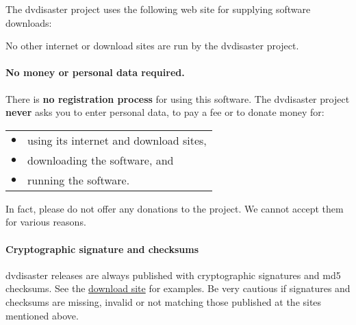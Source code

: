 \smallskip

The dvdisaster project uses the following web site for supplying software downloads:

\begin{center}
  \homepage
\end{center}

\begin{comment}
The dvdisaster project uses the following internet domains for publishing
its web sites and supplying software downloads:

\begin{center}
  \begin{tabular}{l}
dvdisaster.com\\
dvdisaster.de\\
dvdisaster.net\\
dvdisaster.org
  \end{tabular}
\end{center}

All domains are forwarded to the same site at dvdisaster.net.
\end{comment}

No other internet or download sites are run by the dvdisaster project.

\paragraph{No money or personal data required.}\quad

\smallskip

There is {\bf no registration process} for using this software.
The dvdisaster project {\bf never} asks you to enter personal data,
to pay a fee or to donate money for:

\smallskip

\begin{tabular}{ll}
$\bullet$ & using its internet and download sites,\\
$\bullet$ & downloading the software, and\\
$\bullet$ & running the software. \\
\end{tabular}

\smallskip

In fact, please do not offer any donations to the project. 
We cannot accept them for various reasons.

\paragraph{Cryptographic signature and checksums}\quad
\smallskip

dvdisaster releases are always published with cryptographic signatures
and md5 checksums. See the \href{https://web.archive.org/web/20180428070843/http://dvdisaster.net}{download site} for examples.
Be very cautious if signatures and checksums are missing, invalid or not
matching those published at the sites mentioned above.
